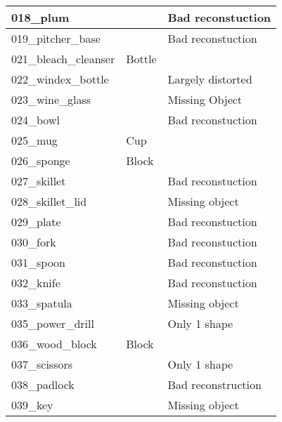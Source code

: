 \documentclass{article}
\begin{document}
\begin{longtable}{|l|l|l|}
018\_plum                    &                & Bad reconstuction                     \\ \hline
019\_pitcher\_base           &                & Bad reconstuction                     \\ \hline
021\_bleach\_cleanser        & Bottle         &                                       \\ \hline
022\_windex\_bottle          &                & Largely distorted                     \\ \hline
023\_wine\_glass             &                & Missing Object                        \\ \hline
024\_bowl                    &                & Bad reconstuction                     \\ \hline
025\_mug                     & Cup            &                                       \\ \hline
026\_sponge                  & Block          &                                       \\ \hline
027\_skillet                 &                & Bad reconstuction                     \\ \hline
028\_skillet\_lid            &                & Missing object                        \\ \hline
029\_plate                   &                & Bad reconstuction                     \\ \hline
030\_fork                    &                & Bad reconstuction                     \\ \hline
031\_spoon                   &                & Bad reconstuction                     \\ \hline
032\_knife                   &                & Bad reconstuction                     \\ \hline
033\_spatula                 &                & Missing object                        \\ \hline
035\_power\_drill            &                & Only 1 shape                          \\ \hline
036\_wood\_block             & Block          &                                       \\ \hline
037\_scissors                &                & Only 1 shape                          \\ \hline
038\_padlock                 &                & Bad reconstruction                    \\ \hline
039\_key                     &                & Missing object                        \\ \hline

\end{longtable}
\end{document}
